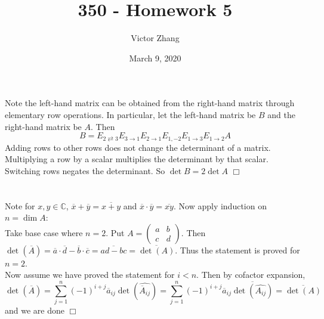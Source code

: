 \documentclass{article}
\title{350 - Homework 5}
\author{Victor Zhang}
\date{March 9, 2020}
\begin{document}
\maketitle

\section{}
Note the left-hand matrix can be obtained from the right-hand matrix through elementary row operations. In particular, let the left-hand matrix be $B$ and the right-hand matrix be $A$. Then
$$B = E_{2\rightleftarrows3}E_{3\rightarrow1}E_{2\rightarrow1}E_{1,-2}E_{1\rightarrow3}E_{1\rightarrow2}A$$
Adding rows to other rows does not change the determinant of a matrix. Multiplying a row by a scalar multiplies the determinant by that scalar. Switching rows negates the determinant. So $\det B = 2\det A$ $\Box$



\section{}
\subsection{}
Note for $x,y \in \mathbb{C}$, $\overline{x} + \overline{y} = \overline{x+y}$ and $\overline{x}\cdot\overline{y} = \overline{xy}$. Now apply induction on $n = \dim A$:\\
Take base case where $n = 2$. Put $A = \left( \begin{matrix} a & b \\ c & d \end{matrix} \right)$. Then $\det(\overline{A}) = \overline{a}\cdot\overline{d}-\overline{b}\cdot\overline{c} = \overline{ad-bc} = \overline{\det(A)}$. Thus the statement is proved for $n = 2$.\\
Now assume we have proved the statement for $i < n$. Then by cofactor expansion,
$$\det (\overline{A}) = \sum\limits_{j=1}^n (-1)^{i+j} \overline{a}_{ij} \det (\widehat{\overline{A}_{ij}}) = \sum\limits_{j=1}^n (-1)^{i+j} \overline{a}_{ij} \overline{\det (\widehat{A_{ij}})} = \overline{\det(A)}$$
and we are done $\Box$
\end{document}
